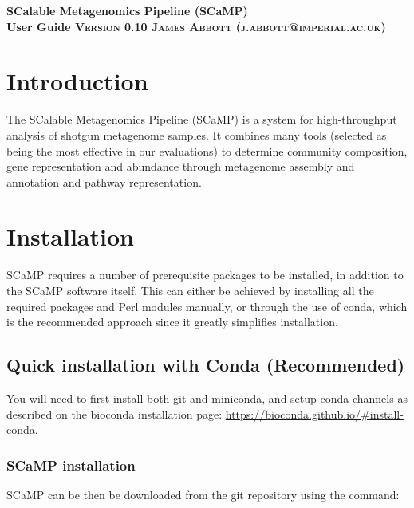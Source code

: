 \documentclass[a4paper,10pt]{article}
\begin{document}
\begin{titlepage}
\begin{center}
  \bfseries
  \huge SCalable Metagenomics Pipeline (SCaMP) \\User Guide
  \vskip 0.1in
  \textsc{\normalsize Version 0.10 }
  \vskip 0.1in
  \textsc{\normalsize James Abbott (j.abbott@imperial.ac.uk)}
\end{center}

\tableofcontents
\renewcommand{\baselinestretch}{1.0}\normalsize
\end{titlepage}
\newpage
\graphicspath{ {images/} }

\section{Introduction}

The SCalable Metagenomics Pipeline (SCaMP) is a system for high-throughput
analysis of shotgun metagenome samples. It combines many tools (selected as
being the most effective in our evaluations) to determine community
composition, gene representation and abundance through metagenome assembly and
annotation and pathway representation. 

\section{Installation}

SCaMP requires a number of prerequisite packages to be installed, in addition                            
to the SCaMP software itself. This can either be achieved by installing all the
required packages and Perl modules manually, or through the use of conda, which
is the recommended approach since it greatly simplifies installation.  

\subsection{Quick installation with Conda (Recommended)}

You will need to first install both git and miniconda, and setup conda channels
as described on the bioconda installation page: \url{https://bioconda.github.io/#install-conda}.                                  

\subsubsection{SCaMP installation}

SCaMP can be then be downloaded from the git repository using the command:                                           
\end{document}
